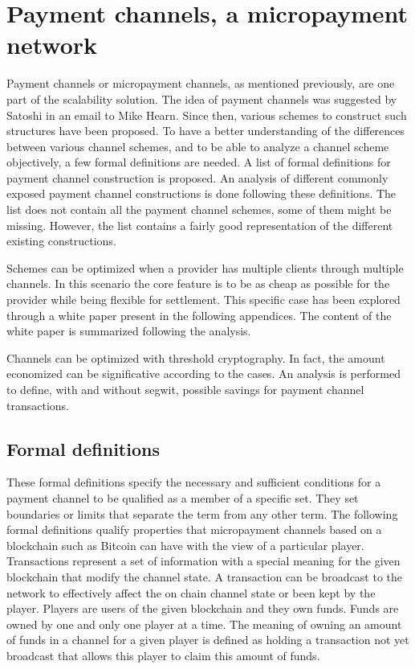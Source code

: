 \chapter{Payment channels, a micropayment network}
\label{chap:paymentChannels}

Payment channels or micropayment channels, as mentioned previously, are one part
of the scalability solution. The idea of payment channels was suggested by
Satoshi in an email to Mike Hearn. Since then, various schemes to construct
such structures have been proposed. To have a better understanding of the
differences between various channel schemes, and to be able to analyze a channel
scheme objectively, a few formal definitions are needed. A list of formal definitions for
payment channel construction is proposed. An analysis of different commonly
exposed payment channel constructions is done following these definitions. The
list does not contain all the payment channel schemes, some of them
might be missing. However, the list contains a fairly good representation of the
different existing constructions.

Schemes can be optimized when a provider has multiple clients through multiple
channels. In this scenario the core feature is to be as cheap as possible for
the provider while being flexible for settlement. This specific case has been
explored through a white paper present in the following appendices. The content
of the white paper is summarized following the analysis.

Channels can be optimized with threshold cryptography. In fact, the amount
economized can be significative according to the cases. An analysis is performed
to define, with and without \gls{segwit}, possible savings for
payment channel transactions.

\minitoc

\newpage

\section{Formal definitions}

These formal definitions specify the necessary and sufficient conditions for a
payment channel to be qualified as a member of a specific set. They set boundaries or limits that separate
the term from any other term. The following formal definitions qualify
properties that micropayment channels based on a blockchain such as Bitcoin can
have with the view of a particular player. Transactions represent a set of
information with a special meaning for the given blockchain that modify the
channel state. A transaction can be broadcast to the network to effectively
affect the on chain channel state or been kept by the player. Players are users of the
given blockchain and they own funds. Funds are owned by one and only one
player at a time. The meaning of owning an amount of funds in a channel for a given player is defined as holding a transaction not yet broadcast that allows this player to claim this amount of funds.

